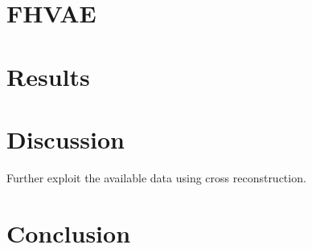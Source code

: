 \documentclass{article} %
\begin{document}
\section*{FHVAE}
\lipsum[4-6]\cite{Cranmer2020}

\section*{Results}
\lipsum[7-12]\cite{Brehmer2020}

\section*{Discussion}
Further exploit the available data using cross reconstruction.

\section*{Conclusion}
\lipsum[1-2]




\end{document}
